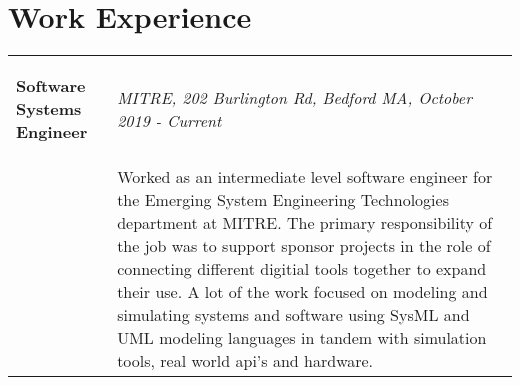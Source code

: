 \documentclass[10pt]{article}
\begin{document}
\section*{Work Experience}
\begin{tabular}{l | p{13cm}}
	\begin{minipage}[t]{4cm}
    \begin{flushleft}
      \large \textbf{Software Systems Engineer}
    \end{flushleft}
	\end{minipage} & 
	\textit{MITRE, 202 Burlington Rd, Bedford MA, October 2019 - Current}\\
	& Worked as an intermediate level software engineer for the Emerging System Engineering Technologies department at MITRE. The primary responsibility of the job was to support sponsor projects in the role of connecting different digitial tools together to expand their use. A lot of the work focused on modeling and simulating systems and software using SysML and UML modeling languages in tandem with simulation tools, real world api's and hardware. \\
\end{tabular}

\end{document}
